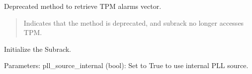 \documentclass[letterpaper,10pt,english]{sphinxmanual}
\begin{document}
\begin{fulllineitems}
\begin{fulllineitems}
\begin{quote}
\begin{description}
\end{description}\end{quote}

\end{fulllineitems}


\begin{fulllineitems}
\label{\detokenize{apidocs:subrack_management_board.SubrackMngBoard.Get_tpm_alarms_vector}}
\pysigstartsignatures
{}
\pysigstopsignatures
\sphinxAtStartPar
Deprecated method to retrieve TPM alarms vector.
\begin{quote}\begin{description}
\sphinxAtStartPar
{\hyperref[\detokenize{apidocs:subrack_management_board.SubrackExecFault}]{}} \textendash{} Indicates that the method is deprecated, and
subrack no longer accesses TPM.

\end{description}\end{quote}

\end{fulllineitems}


\begin{fulllineitems}
\label{\detokenize{apidocs:subrack_management_board.SubrackMngBoard.Initialize}}
\pysigstartsignatures
{}
\pysigstopsignatures
\sphinxAtStartPar
Initialize the Subrack.

\sphinxAtStartPar
Parameters:
\sphinxhyphen{} pll\_source\_internal (bool): Set to True to use internal PLL source.

\end{fulllineitems}



\end{fulllineitems}
\end{document}
